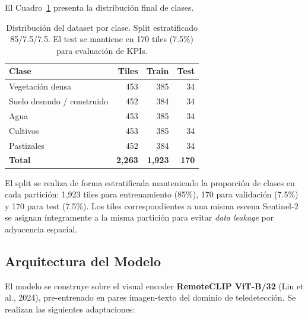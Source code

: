 \documentclass[10pt,a4paper,twocolumn]{article}
\begin{document}
El Cuadro~\ref{tab:clases_sit2} presenta la distribución final de clases.

\begin{table}[H]
  \centering
  \small
  \begin{tabular}{lrrr}
    \toprule
    \textbf{Clase} & \textbf{Tiles} & \textbf{Train} & \textbf{Test} \\
    \midrule
    Vegetación densa        & 453 & 385 & 34 \\
    Suelo desnudo / construido & 452 & 384 & 34 \\
    Agua                    & 453 & 385 & 34 \\
    Cultivos                & 453 & 385 & 34 \\
    Pastizales              & 452 & 384 & 34 \\
    \midrule
    \textbf{Total}          & \textbf{2,263} & \textbf{1,923} & \textbf{170} \\
    \bottomrule
  \end{tabular}
  \caption{Distribución del dataset por clase. Split estratificado 85/7.5/7.5. El test se mantiene en 170 tiles (7.5\%) para evaluación de KPIs.}
  \label{tab:clases_sit2}
\end{table}

El split se realiza de forma estratificada manteniendo la proporción de clases en cada partición: 1,923 tiles para entrenamiento (85\%), 170 para validación (7.5\%) y 170 para test (7.5\%). Los tiles correspondientes a una misma escena Sentinel-2 se asignan íntegramente a la misma partición para evitar \textit{data leakage} por adyacencia espacial.

\subsection{Arquitectura del Modelo}

El modelo se construye sobre el visual encoder \textbf{RemoteCLIP ViT-B/32} (Liu et al., 2024), pre-entrenado en pares imagen-texto del dominio de teledetección. Se realizan las siguientes adaptaciones:
\end{document}
